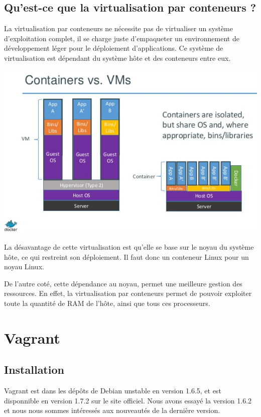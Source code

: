\documentclass[12pt,a4paper]{article}
\begin{document}
\subsection{Qu'est-ce que la virtualisation par conteneurs ?}

La virtualisation par conteneurs ne nécessite pas de virtualiser un système d'exploitation complet, il se charge juste d'empaqueter un environnement de développement léger pour le déploiement d'applications. Ce système de virtualisation est dépendant du système hôte et des conteneurs entre eux. 

\begin{center}
  \includegraphics[width=15cm]{images_rapport/vm_container.jpg}
\end{center}

La désavantage de cette virtualisation est qu'elle se base sur le noyau du système hôte, ce qui restreint son déploiement. Il faut donc un conteneur Linux pour un noyau Linux. 

De l'autre coté, cette dépendance au noyau, permet une meilleure gestion des ressources. En effet, la virtualisation par conteneurs permet de pouvoir exploiter toute la quantité de RAM de l'hôte, ainsi que tous ces processeurs.

\section{Vagrant}

\subsection{Installation}
Vagrant est dans les dépôts de Debian unstable en version 1.6.5, et est disponnible en version 1.7.2 sur le site officiel. Nous avons essayé la version 1.6.2 et nous nous sommes intéressés aux nouveautés de la dernière version.
\end{document}
